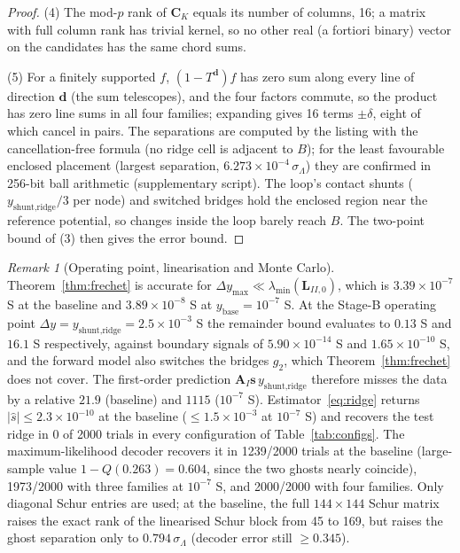 \documentclass[11pt,a4paper]{article}
\theoremstyle{definition}
\theoremstyle{remark}
\newtheorem{remark}[theorem]{Remark}
\begin{document}
\begin{proof}
(4) The mod-$p$ rank of $\mathbf{C}_K$ equals its number of columns, 16; a matrix with full column rank has trivial kernel, so no other real (a fortiori binary) vector on the candidates has the same chord sums.

(5) For a finitely supported $f$, $(1-T^{\mathbf{d}})f$ has zero sum along every line of direction $\mathbf{d}$ (the sum telescopes), and the four factors commute, so the product has zero line sums in all four families; expanding gives 16 terms $\pm\delta$, eight of which cancel in pairs. The separations are computed by the listing with the cancellation-free formula (no ridge cell is adjacent to $B$); for the least favourable enclosed placement (largest separation, $6.273\times10^{-4}\,\sigma_\Lambda$) they are confirmed in 256-bit ball arithmetic (supplementary script). The loop's contact shunts ($y_{\text{shunt,ridge}}/3$ per node) and switched bridges hold the enclosed region near the reference potential, so changes inside the loop barely reach $B$. The two-point bound of (3) then gives the error bound.
\end{proof}

\begin{remark}[Operating point, linearisation and Monte Carlo]\label{rem:mc}
Theorem~\ref{thm:frechet} is accurate for $\Delta y_{\max}\ll\lambda_{\min}(\mathbf{L}_{II,0})$, which is $3.39\times10^{-7}$ S at the baseline and $3.89\times10^{-8}$ S at $y_{\text{base}} = 10^{-7}$ S. At the Stage-B operating point $\Delta y = y_{\text{shunt,ridge}} = 2.5\times10^{-3}$ S the remainder bound evaluates to $0.13$ S and $16.1$ S respectively, against boundary signals of $5.90\times10^{-14}$ S and $1.65\times10^{-10}$ S, and the forward model also switches the bridges $g_2$, which Theorem~\ref{thm:frechet} does not cover. The first-order prediction $\mathbf{A}_I\mathbf{s}\,y_{\text{shunt,ridge}}$ therefore misses the data by a relative $21.9$ (baseline) and $1115$ ($10^{-7}$ S). Estimator~\eqref{eq:ridge} returns $|\hat s|\le 2.3\times10^{-10}$ at the baseline ($\le 1.5\times10^{-3}$ at $10^{-7}$ S) and recovers the test ridge in 0 of 2000 trials in every configuration of Table~\ref{tab:configs}. The maximum-likelihood decoder recovers it in 1239/2000 trials at the baseline (large-sample value $1-Q(0.263) = 0.604$, since the two ghosts nearly coincide), 1973/2000 with three families at $10^{-7}$ S, and 2000/2000 with four families. Only diagonal Schur entries are used; at the baseline, the full $144\times144$ Schur matrix raises the exact rank of the linearised Schur block from 45 to 169, but raises the ghost separation only to $0.794\,\sigma_\Lambda$ (decoder error still $\ge 0.345$).
\end{remark}
\end{document}
